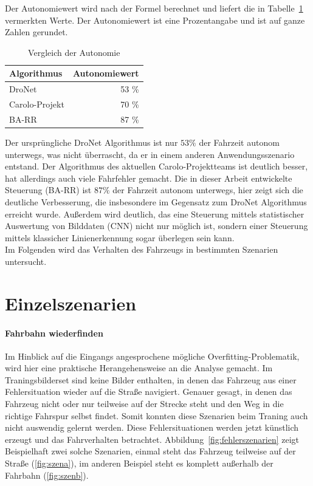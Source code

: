 Der Autonomiewert wird nach der Formel berechnet und liefert die in Tabelle~\ref{tab:autonomie} vermerkten Werte. Der Autonomiewert ist eine Prozentangabe und ist auf ganze Zahlen gerundet.

\begin{table}[h]
  \begin{center}
    \caption{Vergleich der Autonomie}
    \label{tab:autonomie}
    \begin{tabular}{l|r} %
      \textbf{Algorithmus} & \textbf{Autonomiewert} \\
      \hline
      DroNet & 53 \% \\
      Carolo-Projekt & 70 \%  \\
       BA-RR& 87 \% \\
    \end{tabular}
  \end{center}
\end{table}

Der ursprüngliche DroNet Algorithmus ist nur $53 \%$ der Fahrzeit autonom unterwegs, was nicht überrascht, da er in einem anderen Anwendungsszenario entstand. Der Algorithmus des aktuellen Carolo-Projektteams ist deutlich besser, hat allerdings auch viele Fahrfehler gemacht. Die in dieser Arbeit entwickelte Steuerung (BA-RR) ist $87 \%$ der Fahrzeit autonom unterwegs, hier zeigt sich die deutliche Verbesserung, die insbesondere im Gegensatz zum DroNet Algorithmus erreicht wurde. Außerdem wird deutlich, das eine Steuerung mittels statistischer Auswertung von Bilddaten (CNN) nicht nur möglich ist, sondern einer Steuerung mittels klassicher Linienerkennung sogar überlegen sein kann. \\
Im Folgenden wird das Verhalten des Fahrzeugs in bestimmten Szenarien untersucht.

\section{Einzelszenarien}

\paragraph{Fahrbahn wiederfinden}
Im Hinblick auf die Eingangs angesprochene mögliche Overfitting-Problematik, wird hier eine praktische Herangehensweise an die Analyse gemacht.
Im Traningsbilderset sind keine Bilder enthalten, in denen das Fahrzeug aus einer Fehlersituation wieder auf die Straße navigiert. Genauer gesagt, in denen das Fahrzeug nicht oder nur teilweise auf der Strecke steht und den Weg in die richtige Fahrspur selbst findet. Somit konnten diese Szenarien beim Traning auch nicht \glqq auswendig \grqq{} gelernt werden. Diese Fehlersituationen werden jetzt künstlich erzeugt und das Fahrverhalten betrachtet.
Abbildung~\ref{fig:fehlerszenarien} zeigt Beispielhaft zwei solche Szenarien, einmal steht das Fahrzeug teilweise auf der Straße (\ref{fig:szena}), im anderen Beispiel steht es komplett außerhalb der Fahrbahn (\ref{fig:szenb}).


